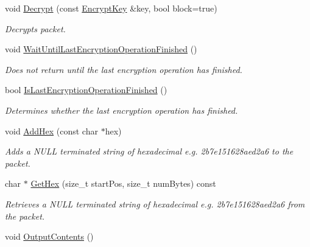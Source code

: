 \begin{DoxyCompactItemize}
void \hyperlink{class_packet_a4514e3e3fa894e5b4d6f5fab5f091ca3}{Decrypt} (const \hyperlink{class_encrypt_key}{EncryptKey} \&key, bool block=true)
\begin{DoxyCompactList}\small\item\em Decrypts packet. \item\end{DoxyCompactList}\item 
\hypertarget{class_packet_a86cd877cd9866ffa52eb83f147d01d69}{
void \hyperlink{class_packet_a86cd877cd9866ffa52eb83f147d01d69}{WaitUntilLastEncryptionOperationFinished} ()}
\label{class_packet_a86cd877cd9866ffa52eb83f147d01d69}

\begin{DoxyCompactList}\small\item\em Does not return until the last encryption operation has finished. \item\end{DoxyCompactList}\item 
bool \hyperlink{class_packet_a6c4f956822f2a7becf84f94d55642da6}{IsLastEncryptionOperationFinished} ()
\begin{DoxyCompactList}\small\item\em Determines whether the last encryption operation has finished. \item\end{DoxyCompactList}\item 
void \hyperlink{class_packet_a67ceba4df218fe99c98735be075527f9}{AddHex} (const char $\ast$hex)
\begin{DoxyCompactList}\small\item\em Adds a NULL terminated string of hexadecimal e.g. 2b7e151628aed2a6 to the packet. \item\end{DoxyCompactList}\item 
char $\ast$ \hyperlink{class_packet_a4726a5ac096197b383fd18c728711cf1}{GetHex} (size\_\-t startPos, size\_\-t numBytes) const 
\begin{DoxyCompactList}\small\item\em Retrieves a NULL terminated string of hexadecimal e.g. 2b7e151628aed2a6 from the packet. \item\end{DoxyCompactList}\item 
\hypertarget{class_packet_aa464430375a70fcf692b697b0b17a91d}{
void \hyperlink{class_packet_aa464430375a70fcf692b697b0b17a91d}{OutputContents} ()}
\label{class_packet_aa464430375a70fcf692b697b0b17a91d}


\end{DoxyCompactItemize}
